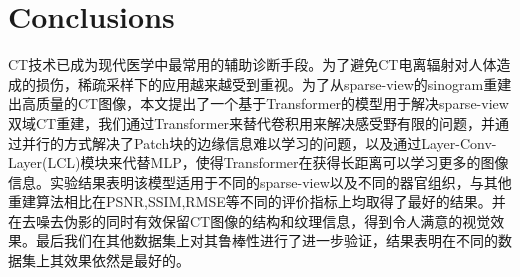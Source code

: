 \section{Conclusions}
CT技术已成为现代医学中最常用的辅助诊断手段。为了避免CT电离辐射对人体造成的损伤，稀疏采样下的应用越来越受到重视。为了从sparse-view的sinogram重建出高质量的CT图像，本文提出了一个基于Transformer的模型用于解决sparse-view双域CT重建，我们通过Transformer来替代卷积用来解决感受野有限的问题，并通过并行的方式解决了Patch块的边缘信息难以学习的问题，以及通过Layer-Conv-Layer(LCL)模块来代替MLP，使得Transformer在获得长距离可以学习更多的图像信息。实验结果表明该模型适用于不同的sparse-view以及不同的器官组织，与其他重建算法相比在PSNR,SSIM,RMSE等不同的评价指标上均取得了最好的结果。并在去噪去伪影的同时有效保留CT图像的结构和纹理信息，得到令人满意的视觉效果。最后我们在其他数据集上对其鲁棒性进行了进一步验证，结果表明在不同的数据集上其效果依然是最好的。